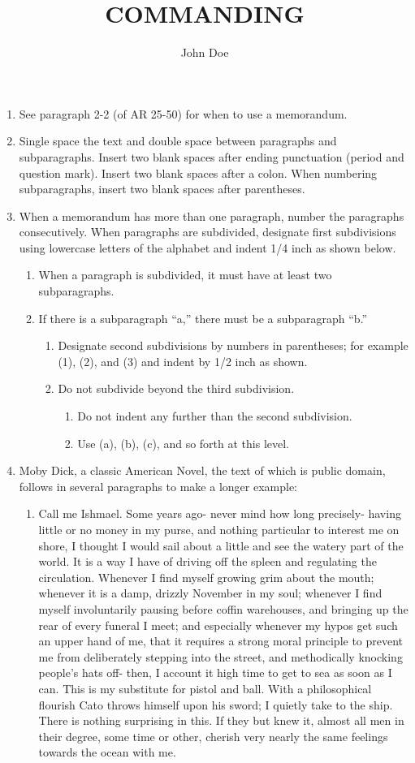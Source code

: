 \documentclass{../armymemo}
\author{John Doe}\rank{CPT}\branch{CY}\title{COMMANDING}
\begin{document}
\begin{enumerate}
\item See paragraph 2-2 (of AR 25-50) for when to use a memorandum.
\item Single space the text and double space between paragraphs and subparagraphs. Insert two blank spaces after ending punctuation (period and question mark). Insert two blank spaces after a colon. When numbering subparagraphs, insert two blank spaces after parentheses.
\item When a memorandum has more than one paragraph, number the paragraphs consecutively. When paragraphs are subdivided, designate first subdivisions using lowercase letters of the alphabet and indent 1/4 inch as shown below.
  \begin{enumerate}
  \item When a paragraph is subdivided, it must have at least two subparagraphs.
  \item If there is a subparagraph ``a,'' there must be a subparagraph ``b.''
    \begin{enumerate}
    \item Designate second subdivisions by numbers in parentheses; for example (1), (2), and (3) and indent by 1/2 inch as shown.
    \item Do not subdivide beyond the third subdivision.
      \begin{enumerate}
      \item Do not indent any further than the second subdivision.
      \item Use (a), (b), (c), and so forth at this level.
      \end{enumerate}
    \end{enumerate}
  \end{enumerate}
\item Moby Dick, a classic American Novel, the text of which is public domain,
  follows in several paragraphs to make a longer example:

  \begin{enumerate}
  \item Call me Ishmael. Some years ago- never mind how long precisely- having little or
    no money in my purse, and nothing particular to interest me on shore, I thought
    I would sail about a little and see the watery part of the world. It is a way I
    have of driving off the spleen and regulating the circulation. Whenever I find
    myself growing grim about the mouth; whenever it is a damp, drizzly November in
    my soul; whenever I find myself involuntarily pausing before coffin warehouses,
    and bringing up the rear of every funeral I meet; and especially whenever my
    hypos get such an upper hand of me, that it requires a strong moral principle to
    prevent me from deliberately stepping into the street, and methodically knocking
    people's hats off- then, I account it high time to get to sea as soon as I can.
    This is my substitute for pistol and ball. With a philosophical flourish Cato
    throws himself upon his sword; I quietly take to the ship. There is nothing
    surprising in this. If they but knew it, almost all men in their degree, some
    time or other, cherish very nearly the same feelings towards the ocean with me.


\end{enumerate}
\end{enumerate}
\end{document}
